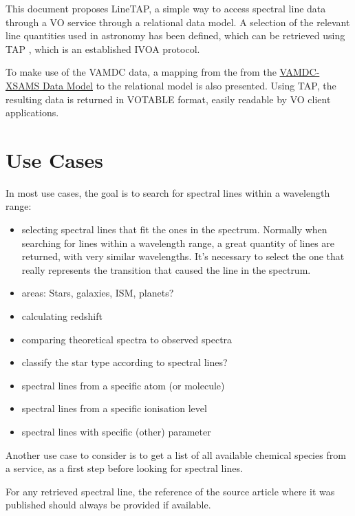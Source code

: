 \documentclass[11pt,a4paper]{ivoa}
\begin{document}
This document proposes LineTAP, a simple way to access spectral line
data through a VO service through a relational data model. A selection
of the relevant line quantities used in astronomy has been defined,
which can be retrieved using TAP \citep{std:TAP}, which is an
established IVOA protocol. 

To make use of the VAMDC data, a mapping from the from the
\href{https://standards.vamdc.eu/#data-model}{VAMDC-XSAMS Data Model} to
the relational model is also presented. Using TAP, the resulting data is
returned in VOTABLE format,  easily readable by VO client applications. 




\section{Use Cases}

In most use cases, the goal is to search for spectral lines within a
wavelength range:


\begin{itemize}

\item selecting  spectral lines that fit the ones in the spectrum.
Normally when searching for lines within a wavelength range, a great
quantity of lines are returned, with very similar wavelengths. It's
necessary to select the one that really represents the transition that
caused the line in the spectrum.
\item areas: Stars, galaxies, ISM, planets?
\item calculating redshift
\item comparing theoretical spectra to observed spectra
\item classify the star type according to spectral lines?
\item spectral lines from a specific atom (or molecule)
\item spectral lines from a specific ionisation level
\item spectral lines with specific (other) parameter
\end{itemize}

Another use case to consider is to get a list of all available chemical
species 
from a service, as a first step before looking for spectral lines.

For any retrieved spectral line, the reference of the source article
where it was published
should always be provided if available.
\end{document}
